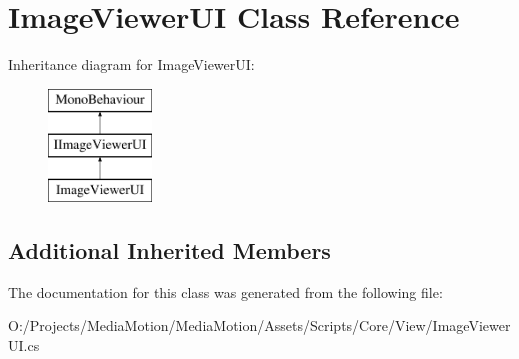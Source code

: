 \hypertarget{class_image_viewer_u_i}{\section{Image\+Viewer\+U\+I Class Reference}
\label{class_image_viewer_u_i}
}
Inheritance diagram for Image\+Viewer\+U\+I\+:\begin{figure}[H]
\begin{center}
\leavevmode
\includegraphics[height=3.000000cm]{class_image_viewer_u_i}
\end{center}
\end{figure}
\subsection*{Additional Inherited Members}


The documentation for this class was generated from the following file\+:\begin{DoxyCompactItemize}
\item 
O\+:/\+Projects/\+Media\+Motion/\+Media\+Motion/\+Assets/\+Scripts/\+Core/\+View/Image\+Viewer\+U\+I.\+cs\end{DoxyCompactItemize}
